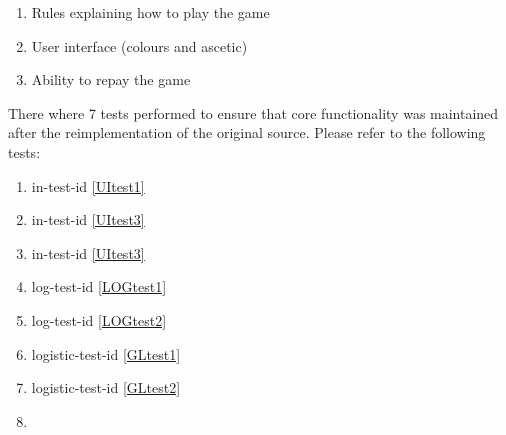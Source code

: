 \documentclass[12pt, titlepage]{article}
\newcommand{\UIref}[1]{in-test-id \ref{#1}}
\newcommand{\LOGref}[1]{log-test-id \ref{#1}}
\newcommand{\GLref}[1]{logistic-test-id \ref{#1}}
\begin{document}
\begin{enumerate}
\item Rules explaining how to play the game
\item User interface (colours and ascetic)
\item Ability to repay the game
\end{enumerate}
There where 7 tests performed to ensure that core functionality was maintained after the reimplementation of the original source. Please refer to the following tests: 
\begin{multicols}{2}

\begin{enumerate}

\item \UIref{UItest1}
\item \UIref{UItest3}
\item \UIref{UItest3}
\item \LOGref{LOGtest1}
\item \LOGref{LOGtest2}
\item \GLref{GLtest1}
\item \GLref{GLtest2}
\item[] 

\end{enumerate}
\end{multicols}	
\end{document}

